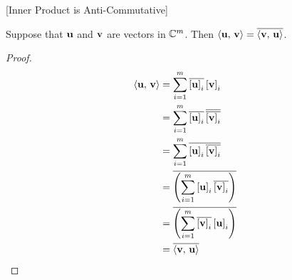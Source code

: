 \documentclass{ximera}
\begin{document}
\begin{theorem}
\label{theorem:IPAC}
[Inner Product is Anti-Commutative]

Suppose that $\mathbf{u}$ and $\mathbf{v}$ are vectors in $\mathbb{C}^{m}$.  Then
$\left\langle\mathbf{u},\,\mathbf{v}\right\rangle=\overline{\left\langle\mathbf{v},\,\mathbf{u}\right\rangle}$.





\begin{proof}

\begin{align*}
\innerproduct{\vect{u}}{\vect{v}}
&=\sum_{i=1}^{m}\conjugate{\vectorentry{\vect{u}}{i}}\vectorentry{\vect{v}}{i}
\\ %
&=\sum_{i=1}^{m}\conjugate{\vectorentry{\vect{u}}{i}}\,\conjugate{\conjugate{\vectorentry{\vect{v}}{i}}}
\\ %
&=\sum_{i=1}^{m}\conjugate{\vectorentry{\vect{u}}{i}\conjugate{\vectorentry{\vect{v}}{i}}}
\\ %
&=\conjugate{\left(\sum_{i=1}^{m}\vectorentry{\vect{u}}{i}\conjugate{\vectorentry{\vect{v}}{i}}\right)}
\\ %
&=\conjugate{\left(\sum_{i=1}^{m}\conjugate{\vectorentry{\vect{v}}{i}}\vectorentry{\vect{u}}{i}\right)}
\\ %
&=\conjugate{\innerproduct{\vect{v}}{\vect{u}}}
\\ %
\end{align*}




\end{proof}
\end{theorem}
\end{document}
